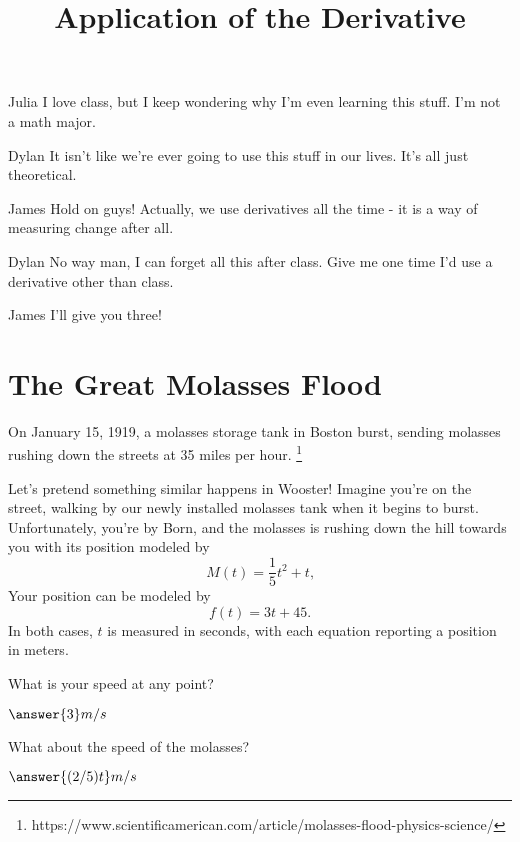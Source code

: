 \documentclass{ximera}
\title{Application of the Derivative}
\begin{document}
\maketitle
\begin{dialogue}
\item[Julia] I love class, but I keep wondering why I'm even learning this stuff. I'm not a math major.
\item[Dylan] It isn't like we're ever going to use this stuff in our lives. It's all just theoretical.
\item[James] Hold on guys! Actually, we use derivatives all the time - it is a way of measuring change after all.
\item[Dylan] No way man, I can forget all this after class. Give me one time I'd use a derivative other than class.
\item[James] I'll give you three!
\end{dialogue}
\section{The Great Molasses Flood}
On January 15, 1919, a molasses storage tank in Boston burst, sending molasses rushing down the streets at 35 miles per hour. \footnote{https://www.scientificamerican.com/article/molasses-flood-physics-science/}

Let's pretend something similar happens in Wooster! Imagine you're on the street, walking by our newly installed molasses tank when it begins to burst. Unfortunately, you're by Born, and the molasses is rushing down the hill towards you with its position modeled by $$M(t)=\frac{1}{5}t^2+t \text{,}$$ Your position can be modeled by $$f(t)=3t+45 \text{.}$$ In both cases, $t$ is measured in seconds, with each equation reporting a position in meters.

\setcounter{problem}{0}
\begin{question}
What is your speed at any point?

$\answer{3}m/s$

What about the speed of the molasses?

$\answer{(2/5)t}m/s$
\end{question}
\end{document}
